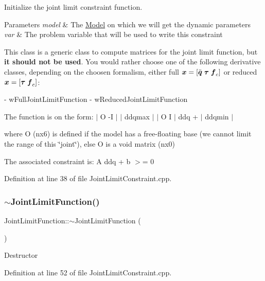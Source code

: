 Initialize the joint limit constraint function.


\begin{DoxyParams}{Parameters}
{\em model} & The \hyperlink{classocra_1_1Model}{Model} on which we will get the dynamic parameters \\
\hline
{\em var} & The problem variable that will be used to write this constraint\\
\hline
\end{DoxyParams}
This class is a generic class to compute matrices for the joint limit function, but {\bfseries it should not be used}. You would rather choose one of the following derivative classes, depending on the choosen formalism, either full $ \mbox{\boldmath${x}$} = [ \ddot{\mbox{\boldmath${q}$}} \; \mbox{\boldmath${\tau}$} \; \mbox{\boldmath${f}$}_c ] $ or reduced $ \mbox{\boldmath${x}$} = [ \mbox{\boldmath${\tau}$} \; \mbox{\boldmath${f}$}_c ] $\+: \begin{DoxyVerb} - wFullJointLimitFunction
 - wReducedJointLimitFunction
\end{DoxyVerb}


The function is on the form\+: $\vert$ O -\/I $\vert$ $\vert$ ddqmax $\vert$ $\vert$ O I $\vert$ ddq + $\vert$ ddqmin $\vert$

where O (nx6) is defined if the model has a free-\/floating base (we cannot limit the range of this \char`\"{}joint\char`\"{}), else O is a void matrix (nx0)

The associated constraint is\+: A ddq + b $>$= 0 

Definition at line 38 of file Joint\+Limit\+Constraint.\+cpp.

\hypertarget{classocra_1_1JointLimitFunction_aa028e738a7dd0e89ef05628abf32d79f}{}\label{classocra_1_1JointLimitFunction_aa028e738a7dd0e89ef05628abf32d79f} 
\subsubsection{\texorpdfstring{$\sim$\+Joint\+Limit\+Function()}{~JointLimitFunction()}}
{\footnotesize\ttfamily Joint\+Limit\+Function\+::$\sim$\+Joint\+Limit\+Function (\begin{DoxyParamCaption}{ }\end{DoxyParamCaption})}

Destructor 

Definition at line 52 of file Joint\+Limit\+Constraint.\+cpp.



